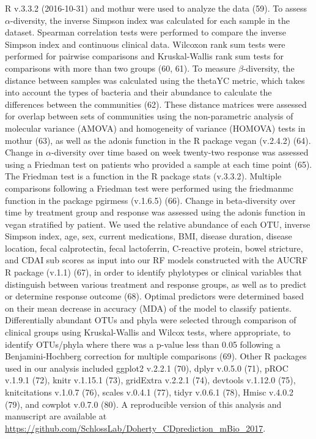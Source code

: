 \documentclass[12pt,]{article}
\begin{document}
R v.3.3.2 (2016-10-31) and mothur were used to analyze the data (59). To
assess \({\alpha}\)-diversity, the inverse Simpson index was calculated
for each sample in the dataset. Spearman correlation tests were
performed to compare the inverse Simpson index and continuous clinical
data. Wilcoxon rank sum tests were performed for pairwise comparisons
and Kruskal-Wallis rank sum tests for comparisons with more than two
groups (60, 61). To measure \({\beta}\)-diversity, the distance between
samples was calculated using the thetaYC metric, which takes into
account the types of bacteria and their abundance to calculate the
differences between the communities (62). These distance matrices were
assessed for overlap between sets of communities using the
non-parametric analysis of molecular variance (AMOVA) and homogeneity of
variance (HOMOVA) tests in mothur (63), as well as the adonis function
in the R package vegan (v.2.4.2) (64). Change in \({\alpha}\)-diversity
over time based on week twenty-two response was assessed using a
Friedman test on patients who provided a sample at each time point (65).
The Friedman test is a function in the R package stats (v.3.3.2).
Multiple comparisons following a Friedman test were performed using the
friedmanmc function in the package pgirmess (v.1.6.5) (66). Change in
beta-diversity over time by treatment group and response was assessed
using the adonis function in vegan stratified by patient. We used the
relative abundance of each OTU, inverse Simpson index, age, sex, current
medications, BMI, disease duration, disease location, fecal
calprotectin, fecal lactoferrin, C-reactive protein, bowel stricture,
and CDAI sub scores as input into our RF models constructed with the
AUCRF R package (v.1.1) (67), in order to identify phylotypes or
clinical variables that distinguish between various treatment and
response groups, as well as to predict or determine response outcome
(68). Optimal predictors were determined based on their mean decrease in
accuracy (MDA) of the model to classify patients. Differentially
abundant OTUs and phyla were selected through comparison of clinical
groups using Kruskal-Wallis and Wilcox tests, where appropriate, to
identify OTUs/phyla where there was a p-value less than 0.05 following a
Benjamini-Hochberg correction for multiple comparisons (69). Other R
packages used in our analysis included ggplot2 v.2.2.1 (70), dplyr
v.0.5.0 (71), pROC v.1.9.1 (72), knitr v.1.15.1 (73), gridExtra v.2.2.1
(74), devtools v.1.12.0 (75), knitcitations v.1.0.7 (76), scales v.0.4.1
(77), tidyr v.0.6.1 (78), Hmisc v.4.0.2 (79), and cowplot v.0.7.0 (80).
A reproducible version of this analysis and manuscript are available at
\url{https://github.com/SchlossLab/Doherty_CDprediction_mBio_2017}.
\end{document}
